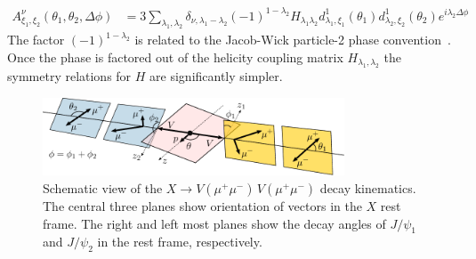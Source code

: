 \documentclass[prd,preprintnumbers,floatfix,
nofootinbib,superscriptaddress]{revtex4}
\begin{document}
\begin{align} \label{eq:decay.A}
  A^{\nu}_{\xi_1,\xi_2}(\theta_1,\theta_2,\Delta\phi) &= 3
  \sum_{\lambda_1,\lambda_2}
  \delta_{\nu,\lambda_1-\lambda_2} (-1)^{1-\lambda_2}
  H_{\lambda_1\lambda_2}
  d_{\lambda_1,\xi_1}^{1}(\theta_1) d_{\lambda_2,\xi_2}^{1}(\theta_2)
  e^{i\lambda_2 \Delta\phi}
\end{align}
The factor $(-1)^{1-\lambda_2}$ is related to the Jacob-Wick particle-2 phase convention~\cite{Jacob:1959at}.
Once the phase is factored out of the helicity coupling matrix $H_{\lambda_1,\lambda_2}$
the symmetry relations for $H$ are significantly simpler.
\begin{figure}
  \includegraphics[width=0.8\textwidth]{../plots/angles.pdf}
  \caption{Schematic view of the $X\to V(\mu^+\mu^-)\,V(\mu^+\mu^-)$ decay kinematics.
  The central three planes show orientation of vectors in the $X$ rest frame.
  The right and left most planes show the decay angles of $J/\psi_1$ and $J/\psi_2$ in the rest frame, respectively.
  }
  \label{fig:decay}
\end{figure}


\end{document}
